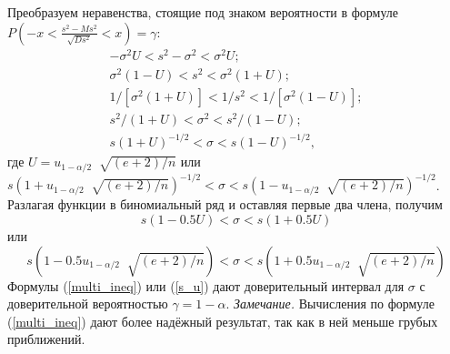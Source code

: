 Преобразуем неравенства, стоящие под знаком вероятности в формуле
\newline
$P\left(-x < \frac{s^{2}-Ms^{2}}{\sqrt{D s^{2}}} < x\right) = \gamma$:
\begin{equation}
    \begin{split}
        -\sigma^{2}U < s^{2} -\sigma^{2} < \sigma^{2}U; \\
       \sigma^{2}(1-U) < s^{2} < \sigma^{2}(1 + U); \\
        1/[\sigma^{2}(1 + U)] < 1/s^{2} < 1/[\sigma^{2}(1-U)];\\
        s^{2}/(1 + U) < \sigma^{2} < s^{2}/(1-U);\\
        s(1 + U)^{-1/2} < \sigma < s(1-U)^{-1/2},
    \end{split}
    \label{multi_ineq}
\end{equation}
где $U = u_{1-\alpha/2}︀\sqrt{(e + 2)/n}$ или
\newline
$s(1 +  u_{1-\alpha/2}︀\sqrt{(e + 2)/n})^{-1/2} <\sigma < s(1-u_{1-\alpha/2}︀\sqrt{(e + 2)/n})^{-1/2}$.
\newline
Разлагая функции в биномиальный ряд и оставляя первые два члена, получим
\begin{equation}
    s(1-0.5U) < \sigma < s(1 + 0.5U)
    \label{s_U}
\end{equation}
 или
\begin{equation}
    s(1-0.5u_{1-\alpha/2}︀\sqrt{(e + 2)/n}) < \sigma < s(1 + 0.5 u_{1-\alpha/2}︀\sqrt{(e + 2)/n})
    \label{s_u}
\end{equation}
Формулы (\ref{multi_ineq}) или (\ref{s_u}) дают доверительный интервал для $\sigma$ с доверительной вероятностью $\gamma = 1-\alpha$. 
\newline
\textit{Замечание.} Вычисления по формуле (\ref{multi_ineq}) дают более надёжный результат, так как в ней меньше грубых приближений.
